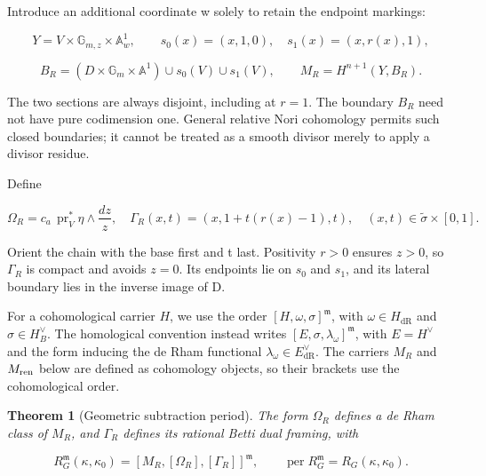 \documentclass[11pt,a4paper,oneside]{article}
\theoremstyle{plain}
\newtheorem{theorem}{Theorem}[section]
\theoremstyle{definition}
\theoremstyle{remark}
\numberwithin{equation}{section}
\begin{document}
Introduce an additional coordinate w solely to retain the endpoint markings:

\begin{equation}
Y=V\times\mathbb G_{m,z}\times\mathbb A^1_w,\qquad
 s_0(x)=(x,1,0),\quad s_1(x)=(x,r(x),1),
\end{equation}

\begin{equation}
B_R=(D\times\mathbb G_m\times\mathbb A^1)
                          \cup s_0(V)\cup s_1(V),\qquad
                M_R=H^{n+1}(Y,B_R).                              \label{eq:primitive:10}
\end{equation}

The two sections are always disjoint, including at \(r=1\). The boundary \(B_R\) need not have pure codimension one. General relative Nori cohomology permits such closed boundaries; it cannot be treated as a smooth divisor merely to apply a divisor residue.

Define

\begin{equation}
\Omega_R=c_a\,\operatorname{pr}_V^*\eta\wedge\frac{dz}{z},
\quad\Gamma_R(x,t)=(x,1+t(r(x)-1),t),\quad
 (x,t)\in\widetilde\sigma\times[0,1].                            \label{eq:primitive:11}
\end{equation}

Orient the chain with the base first and t last. Positivity \(r>0\) ensures \(z>0\), so \(\Gamma _R\) is compact and avoids \(z=0\). Its endpoints lie on \(s_0\) and \(s_1\), and its lateral boundary lies in the inverse image of D.

For a cohomological carrier \(H\), we use the order \([H,\omega,\sigma]^{\mathfrak m}\), with \(\omega\in H_{\mathrm{dR}}\) and \(\sigma\in H_B^\vee\). The homological convention instead writes \([E,\sigma,\lambda_\omega]^{\mathfrak m}\), with \(E=H^\vee\) and the form inducing the de Rham functional \(\lambda_\omega\in E_{\mathrm{dR}}^\vee\). The carriers \(M_R\) and \(M_{\rm ren}\) below are defined as cohomology objects, so their brackets use the cohomological order.

\begin{theorem}[Geometric subtraction period]

\label{thm:primitive:4.1} The form \(\Omega _R\) defines a de Rham class of \(M_R\), and \(\Gamma _R\) defines its rational Betti dual framing, with

\begin{equation}
R_G^{\mathfrak m}(\kappa,\kappa_0)
           =[M_R,[\Omega_R],[\Gamma_R]]^{\mathfrak m},\qquad
          \operatorname{per}R_G^{\mathfrak m}=R_G(\kappa,\kappa_0).           \label{eq:primitive:12}
\end{equation}

\end{theorem}
\end{document}
